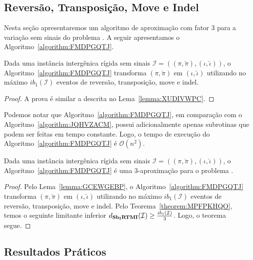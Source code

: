 \subsection{Reversão, Transposição, Move e Indel}

Nesta seção apresentaremos um algoritmo de aproximação com fator $3$ para a variação sem sinais do problema \SbIRTMI{}. A seguir apresentamos o Algoritmo~\ref{algorithm:FMDPGQTJ}.



\begin{lemma}\label{lemma:GCEWGEBP}
Dada uma instância intergênica rígida sem sinais $\mathcal{I}=((\pi,\breve\pi),(\iota,\breve\iota))$, o Algoritmo~\ref{algorithm:FMDPGQTJ} transforma $(\pi,\breve\pi)$ em $(\iota,\breve\iota)$ utilizando no máximo $ib_1(\mathcal{I})$ eventos de reversão, transposição, move e indel.
\end{lemma}
\begin{proof}
  A prova é similar a descrita no Lema~\ref{lemma:XUDIVWPC}.
\end{proof}

Podemos notar que Algoritmo~\ref{algorithm:FMDPGQTJ}, em comparação com o Algoritmo~\ref{algorithm:JQHVZACM}, possui adicionalmente apenas subrotinas que podem ser feitas em tempo constante. Logo, o tempo de execução do Algoritmo~\ref{algorithm:FMDPGQTJ} é $\mathcal{O}(n^2)$.  

\begin{theorem}\label{theorem:NHNVPGEA}
Dada uma instância intergênica rígida sem sinais $\mathcal{I}=((\pi,\breve\pi),(\iota,\breve\iota))$, o Algoritmo~\ref{algorithm:FMDPGQTJ} é uma $3$-aproximação para o problema \SbIRTMI{}.
\end{theorem}
\begin{proof}
Pelo Lema~\ref{lemma:GCEWGEBP}, o Algoritmo~\ref{algorithm:FMDPGQTJ} transforma $(\pi,\breve\pi)$ em $(\iota,\breve\iota)$ utilizando no máximo $ib_1(\mathcal{I})$ eventos de reversão, transposição, move e indel. Pelo Teorema~\ref{theorem:MPFPKHQO}, temos o seguinte limitante inferior $d_{\textbf{Sb\textsubscript{I}RTMI}}(\mathcal{I}) \ge \frac{ib_1(\mathcal{I})}{3}$. Logo, o teorema segue. 
\end{proof}

\subsection{Resultados Práticos}\label{subsection:SIEYCNVZ}

